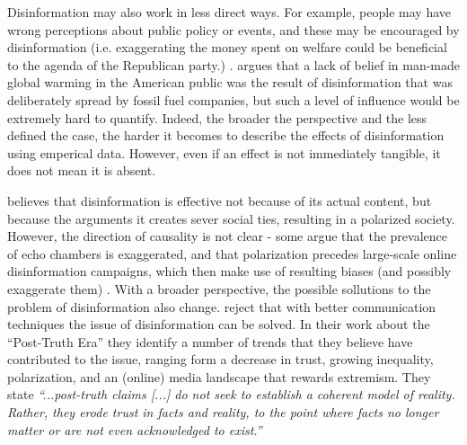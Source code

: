 Disinformation may also work in less direct ways. For example, people may have wrong perceptions about public policy or events, and these may be encouraged by disinformation (i.e. exaggerating the money spent on welfare could be beneficial to the agenda of the Republican party.) \citep{Tucker2018}. \cite{Kolmes2011} argues that a lack of belief in man-made global warming in the American public was the result of disinformation that was deliberately spread by fossil fuel companies, but such a level of influence would be extremely hard to quantify. Indeed, the broader the perspective and the less defined the case, the harder it becomes to describe the effects of disinformation using emperical data. However, even if an effect is not immediately tangible, it does not mean it is absent.
\begin{comment}
if I wanted to go really wild I could talk about hyperobjects here but probably not the best place. Would be a nice concept to use later on though.
\end{comment}
\cite{Asmolov2018} believes that disinformation is effective not because of its actual content, but because the arguments it creates sever social ties, resulting in a polarized society. However, the direction of causality is not clear - some argue that the prevalence of echo chambers is exaggerated, and that polarization precedes large-scale online disinformation campaigns, which then make use of resulting biases (and possibly exaggerate them) \citep{Tucker2018}. With a broader perspective, the possible sollutions to the problem of disinformation also change. \cite{lewandowsky2017beyond} reject that with better communication techniques the issue of disinformation can be solved. In their work about the ``Post-Truth Era'' they identify a number of trends that they believe have contributed to the issue, ranging form a decrease in trust, growing inequality, polarization, and an (online) media landscape that rewards extremism. They state \textit{``...post-truth claims [...] do not seek to establish a coherent model of reality. Rather, they erode trust in facts and reality, to the point where facts no longer matter or are not even acknowledged to exist.''} \\

